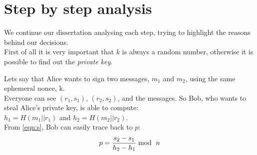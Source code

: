 \section{Step by step analysis}

We continue our dissertation analysing each step, trying to highlight the reasons behind our decisions.\\
First of all it is very important that $k$ is always a random number, otherwise it is possible to find out the \textit{private key}.
\begin{example}
	Lets say that Alice wants to sign two messages, $m_{1}$ and $m_{2}$, using the same ephemeral nonce, k.\\ Everyone can see $(r_{1},s_{1})$, $(r_{2},s_{2})$, and the messages. So Bob, who wants to steal Alice's private key, is able to compute: \\
	$h_{1}=H(m_{1}||r_{1})$ and $h_{2}=H(m_{2}||r_{2})$.\\
	From \eqref{eqn:s}, Bob can easily trace back to $p$: 
	\begin{equation}
	\label{eqn:k}
	p= \frac{s_{2}-s_{1}}{h_{2}-h_{1}} \bmod\ n\\
	\end{equation}
\end{example}


